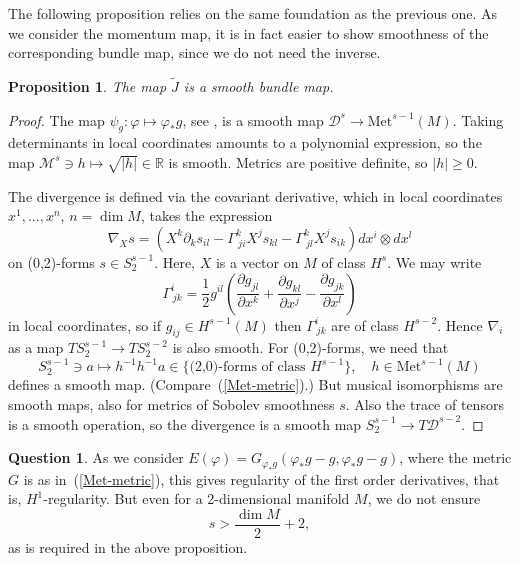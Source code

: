\documentclass[a5paper,10pt,twoside]{article}
\newcommand{\cL}{\ensuremath{\mathcal{L}}}
\newcommand{\cD}{\ensuremath{\mathcal{D}}}
\newcommand{\cM}{\ensuremath{\mathcal{M}}}
\newcommand{\Met}{\ensuremath{\mathrm{Met}}}
\theoremstyle{plain}
\newtheorem{prop}[teo]{Proposition}
\theoremstyle{definition}
\newtheorem{question}{Question}
\theoremstyle{remark}
\begin{document}
The following proposition relies on the same foundation as the previous one. As we consider the momentum map, it is in fact easier to show smoothness of the corresponding bundle map, since we do not need the inverse.

\begin{prop}
	The map $\tilde{J}$ is a smooth bundle map.
\end{prop}

\begin{proof}
	The map $\psi_g:\varphi\mapsto \varphi_*g$, see \cite{ebin1970groups}, is a smooth map $\cD^{s}\to\Met^{s-1}(M)$.
	Taking determinants in local coordinates amounts to a polynomial expression, so the map $\cM^s\ni h\mapsto \sqrt{|h|}\in\mathbb{R}$ is smooth. Metrics are positive definite, so $|h|\geq0$. 
	
	The divergence is defined via the covariant derivative, which in local coordinates $x^1,...,x^{n}$, $n=\dim M$, takes the expression
	\begin{equation}
	\nabla_X s = \left(X^k\partial_k s_{il}-\Gamma^{k}_{\ ji}X^js_{kl}-\Gamma^{k}_{\ jl}X^js_{ik}\right)dx^i\otimes dx^l
	\end{equation}
	on (0,2)-forms $s\in S_2^{s-1}$. Here, $X$ is a vector on $M$ of class $H^s$. We may write 
	$$
	\Gamma^i_{\, jk} = \frac{1}{2}g^{il}\left(\frac{\partial g_{jl}}{\partial x^k}+\frac{\partial g_{kl}}{\partial x^j}-\frac{\partial g_{jk}}{\partial x^l}\right)
	$$ 
	in local coordinates, so if $g_{ij}\in H^{s-1}(M)$ then $\Gamma^i_{\, jk}$ are of class $H^{s-2}.$ Hence $\nabla_i$ as a map $TS_2^{s-1}\to TS_2^{s-2}$ is also smooth. 
	For (0,2)-forms, we need that
	\[ 
	S^{s-1}_2\ni a\mapsto h^{-1}h^{-1}a\in \{\text{(2,0)-forms of class }H^{s-1}\},\quad h\in\Met^{s-1}(M)
	\]
	defines a smooth map. (Compare~(\ref{Met-metric}).) But musical isomorphisms are smooth maps, also for metrics of Sobolev smoothness $s$. 
	Also the trace of tensors is a smooth operation, so the divergence is a smooth map $S_2^{s-1}\to T\cD^{s-2}$.
\end{proof}

\begin{question}
	As we consider $E(\varphi)=G_{\varphi_*g}(\varphi_*g-g,\varphi_*g-g)$, where the metric $G$ is as in~(\ref{Met-metric}), this gives regularity of the first order derivatives, that is, $H^1$-regularity. But even for a 2-dimensional manifold $M$, we do not ensure
	\begin{equation}
	 s>\frac{\dim M}{2}+2,
	\end{equation}
	as is required in the above proposition.
\end{question}
\end{document}
